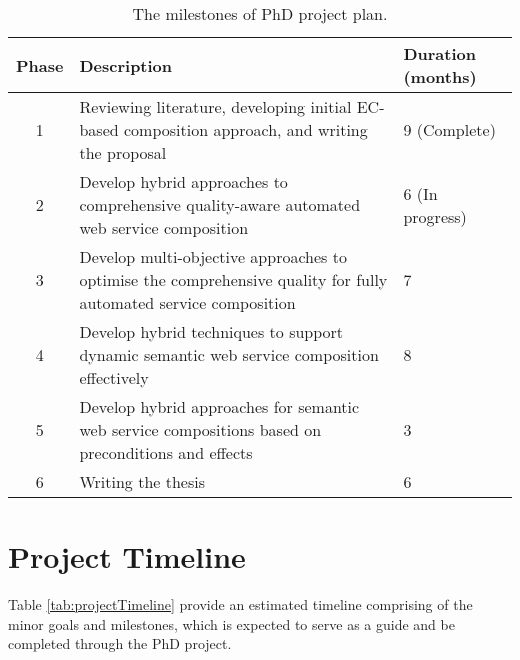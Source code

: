 \begin{table}
\small
\centering
\caption{The milestones of PhD project plan.}
\vspace{0.2cm}
\begin{tabular}{|c|p{100mm}|l|}
\hline
Phase & Description & Duration (months) \\ \hline
1 & Reviewing literature, developing initial EC-based composition approach, and writing the proposal & 9 (Complete)  \\
2 & Develop hybrid approaches to comprehensive quality-aware automated web service composition & 6 (In progress) \\
3 & Develop multi-objective approaches to optimise the comprehensive quality for fully automated service composition & 7 \\
4 & Develop hybrid techniques to support dynamic semantic web service composition effectively & 8 \\
5 & Develop hybrid approaches for semantic web service compositions based on preconditions and effects & 3 \\
6 & Writing the thesis & 6 \\ \hline
\end{tabular}
\label{tab:projectOverview}
\end{table}

\section{Project Timeline}

Table \ref{tab:projectTimeline} provide an estimated timeline comprising of the minor goals and milestones, which is expected to serve as a guide and be completed through the PhD project.

